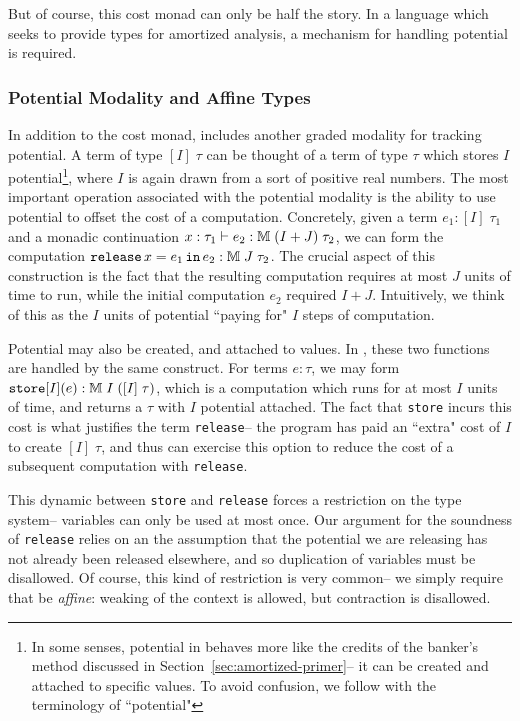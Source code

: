 But of course, this cost monad can only be half the story. In a language which seeks to provide types for amortized analysis, a mechanism for handling potential is required.
 
\subsubsection{Potential Modality and Affine Types}
In addition to the cost monad, \lambdaamor includes another graded modality for tracking potential. A term of type $[I] \; \tau$ can be thought of a term of type $\tau$ which stores $I$ potential\footnote{
In some senses, potential in \lambdaamor behaves more like the credits of the banker's method discussed in Section~\ref{sec:amortized-primer}-- it can be created and attached to specific values. To avoid confusion, we follow \citet{rajani-et-al:popl21} with the terminology of ``potential"
}, where $I$ is again drawn from a sort of positive real numbers.
The most important operation associated with the potential modality is the ability to use potential to offset the cost of a computation. Concretely, given a term $e_1 : [I] \; \tau_1$ and a monadic continuation $x : \tau_1 \vdash e_2 : \mathbb{M} \; (I + J) \; \tau_2$, we can form the computation $\texttt{release}\, x = e_1 \, \texttt{in}\, e_2 : \mathbb{M} \; J \; \tau_2$. The crucial aspect of this construction is the fact that the resulting computation requires at most $J$ units of time to run, while the initial computation $e_2$ required $I + J$. Intuitively, we think of this as the $I$ units of potential ``paying for" $I$ steps of computation. 

Potential may also be created, and attached to values. In \lambdaamor, these two functions are handled by the same construct. For terms $e : \tau$, we may form $\texttt{store}[I](e) : \mathbb{M} \; I \; ([I] \; \tau)$, which is a computation which runs for at most $I$ units of time, and returns a $\tau$ with $I$ potential attached. The fact that \texttt{store} incurs this cost is what justifies the term \texttt{release}-- the program has paid an ``extra" cost of $I$ to create $[I] \; \tau$, and thus can exercise this option to reduce the cost of a subsequent computation with \texttt{release}.

This dynamic between \texttt{store} and \texttt{release} forces a restriction on the type system-- variables can only be used at most once. Our argument for the soundness of \texttt{release} relies on an the assumption that the potential we are releasing has not already been released elsewhere, and so duplication of variables must be disallowed. Of course, this kind of restriction is very common-- we simply require that \lambdaamor be \textit{affine}: weaking of the context is allowed, but contraction is disallowed. 

